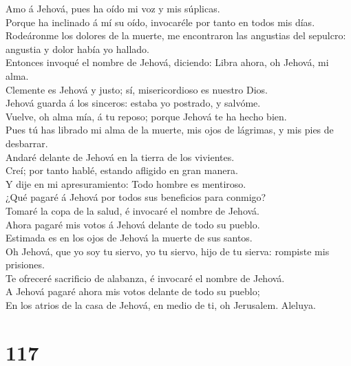  Amo á Jehová, pues ha oído mi voz y mis súplicas.\\
 Porque ha inclinado á mí su oído, invocaréle por tanto en
todos mis días.\\
 Rodeáronme los dolores de la muerte, me encontraron las
angustias del sepulcro: angustia y dolor había yo hallado.\\
 Entonces invoqué el nombre de Jehová, diciendo: Libra
ahora, oh Jehová, mi alma.\\
 Clemente es Jehová y justo; sí, misericordioso es nuestro
Dios.\\
 Jehová guarda á los sinceros: estaba yo postrado, y
salvóme.\\
 Vuelve, oh alma mía, á tu reposo; porque Jehová te ha hecho
bien.\\
 Pues tú has librado mi alma de la muerte, mis ojos de
lágrimas, y mis pies de desbarrar.\\
 Andaré delante de Jehová en la tierra de los vivientes.\\
 Creí; por tanto hablé, estando afligido en gran manera.\\
 Y dije en mi apresuramiento: Todo hombre es mentiroso.\\
 ¿Qué pagaré á Jehová por todos sus beneficios para
conmigo?\\
 Tomaré la copa de la salud, é invocaré el nombre de
Jehová.\\
 Ahora pagaré mis votos á Jehová delante de todo su
pueblo.\\
 Estimada es en los ojos de Jehová la muerte de sus
santos.\\
 Oh Jehová, que yo soy tu siervo, yo tu siervo, hijo de tu
sierva: rompiste mis prisiones.\\
 Te ofreceré sacrificio de alabanza, é invocaré el nombre
de Jehová.\\
 A Jehová pagaré ahora mis votos delante de todo su
pueblo;\\
 En los atrios de la casa de Jehová, en medio de ti, oh
Jerusalem. Aleluya.

\hypertarget{section-116}{%
\section{117}\label{section-116}}

